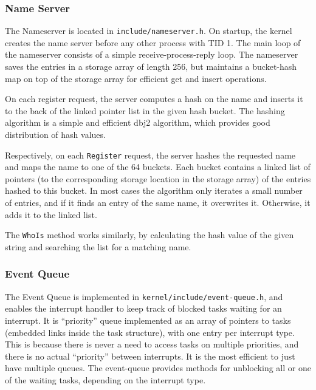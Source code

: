 \documentclass[12pt, titlepage]{article}
\begin{document}
    \subsubsection{Name Server}
    The Nameserver is located in \verb`include/nameserver.h`.
    On startup, the kernel creates the name server before any other process with TID 1.
    The main loop of the nameserver consists of a simple receive-process-reply loop.
    The nameserver saves the entries in a storage array of length 256, but maintains a bucket-hash map on top
    of the storage array for efficient get and insert operations.

    On each register request, the server computes a hash on the name and inserts it to the back of the linked pointer list in the given hash bucket. The hashing algorithm is a simple and efficient dbj2 algorithm, which provides good distribution of hash values.

    Respectively, on each \verb`Register` request, the server hashes the requested name and maps the name to one of the 64 buckets.
    Each bucket contains a linked list of pointers (to the corresponding storage location in the storage array) of the entries hashed to this bucket. In most cases the algorithm only iterates a small number of entries, and if it finds an entry of the same name, it overwrites it. Otherwise, it adds it to the linked list.

    The \verb`WhoIs` method works similarly, by calculating the hash value of the given string and searching the list for a matching name.
    
    \subsubsection{Event Queue}
    \label{sec:event-queue}
    The Event Queue is implemented in \verb`kernel/include/event-queue.h`, and enables the interrupt handler to keep track of blocked tasks waiting for an interrupt. It is ``priority'' queue implemented as an array of pointers to tasks (embedded links inside the task structure), with one entry per interrupt type. This is because there is never a need to access tasks on multiple priorities, and there is no actual ``priority'' between interrupts. It is the most efficient to just have multiple queues. The event-queue provides methods for unblocking all or one of the waiting tasks, depending on the interrupt type.
\end{document}
